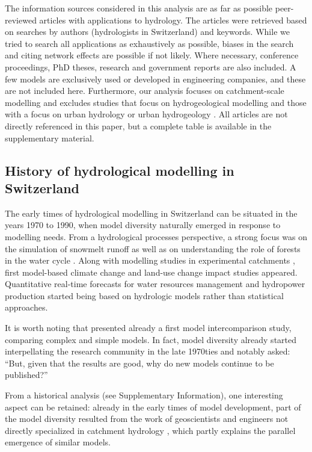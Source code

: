 \documentclass[10pt,a4paper]{article}
\begin{document}
The information sources considered in this analysis are as far as possible peer-reviewed articles with applications to hydrology. The articles were retrieved based on searches by authors (hydrologists in Switzerland) and keywords. While we tried to search all applications as exhaustively as possible, biases in the search and citing network effects are possible if not likely. Where necessary, conference proceedings, PhD theses, research and government reports are also included. A few models are exclusively used or developed in engineering companies, and these are not included here. Furthermore, our analysis focuses on catchment-scale modelling and excludes studies that focus on hydrogeological modelling \citep{Carlier2019} and those with a focus on urban hydrology \citep{Peleg2017} or urban hydrogeology \citep{Schirmer2013}. All articles are not directly referenced in this paper, but a complete table is available in the supplementary material.


\subsection{History of hydrological modelling in Switzerland}
\label{sec:models:history}

The early times of hydrological modelling in Switzerland can be situated in the years 1970 to 1990, when model diversity naturally emerged in response to modelling needs. From a hydrological processes perspective, a strong focus was on the simulation of snowmelt runoff \citep{Braun1986} as well as on understanding the role of forests in the water cycle \citep{Keller1991, Forster1989}. Along with modelling studies in experimental catchments \citep{Iorgulescu1994}, first model-based climate change \citep{Bultot1992a} and land-use change \citep{Jordan1990a} impact studies appeared. Quantitative real-time forecasts for water resources management \citep{Lugiez1969} and hydropower production \citep{Jensenlang1973} started being based on hydrologic models rather than statistical approaches.

It is worth noting that \citet{Naef1977} presented already a first model intercomparison study, comparing complex and simple models. In fact, model diversity already started interpellating the research community in the late 1970ties and \citet{Naef1981} notably asked: ``But, given that the results are good, why do new models continue to be published?'' 

From a historical analysis (see Supplementary Information), one interesting aspect can be retained: already in the early times of model development, part of the model diversity resulted from the work of geoscientists and engineers not directly specialized in catchment hydrology \citep{Abednego1990, Baumgartner1986a, Hager1984, Sautier1980}, which partly explains the parallel emergence of similar models. 
\end{document}
